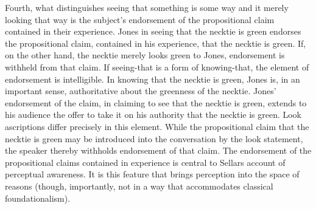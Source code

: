 \documentclass[12pt]{article}
\begin{document}
Fourth, what distinguishes seeing that something is some way and it merely looking that way is the subject's endorsement of the propositional claim contained in their experience. Jones in seeing that the necktie is green endorses the propositional claim, contained in his experience, that the necktie is green. If, on the other hand, the necktie merely looks green to Jones, endorsement is withheld from that claim. If seeing-that is a form of knowing-that, the element of endorsement is intelligible. In knowing that the necktie is green, Jones is, in an important sense, authoritative about the greenness of the necktie. Jones' endorsement of the claim, in claiming to see that the necktie is green, extends to his audience the offer to take it on his authority that the necktie is green. Look ascriptions differ precisely in this element. While the propositional claim that the necktie is green may be introduced into the conversation by the look statement, the speaker thereby withholds endorsement of that claim. The endorsement of the propositional claims contained in experience is central to Sellars account of perceptual awareness. It is this feature that brings perception into the space of reasons (though, importantly, not in a way that accommodates classical foundationalism). %
% 
% 
% 
\end{document}
